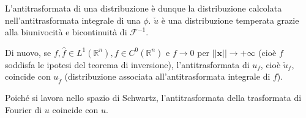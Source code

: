 \documentclass{article}
\begin{document}
L'antitrasformata di una distribuzione \`{e} dunque la distribuzione
calcolata nell'antitrasformata integrale di una $\phi $. $\check{u}$ \`{e}
una distribuzione temperata grazie alla biunivocit\`{a} e bicontinuit\`{a}
di $\mathcal{F}^{-1}$.

Di nuovo, se $f,\hat{f}\in L^{1}\left( 
\mathbb{R}
^{n}\right) ,f\in C^{0}\left( 
\mathbb{R}
^{n}\right) $ e $f\rightarrow 0$ per $\left\vert \left\vert \mathbf{x}%
\right\vert \right\vert \rightarrow +\infty $ (cio\`{e} $f$ soddisfa le
ipotesi del teorema di inversione), l'antitrasformata di $u_{f}$, cio\`{e} $%
\check{u}_{f}$, coincide con $u_{\check{f}}$ (distribuzione associata
all'antitrasformata integrale di $f$).

Poich\'{e} si lavora nello spazio di Schwartz, l'antitrasformata della
trasformata di Fourier di $u$ coincide con $u$.
\end{document}
